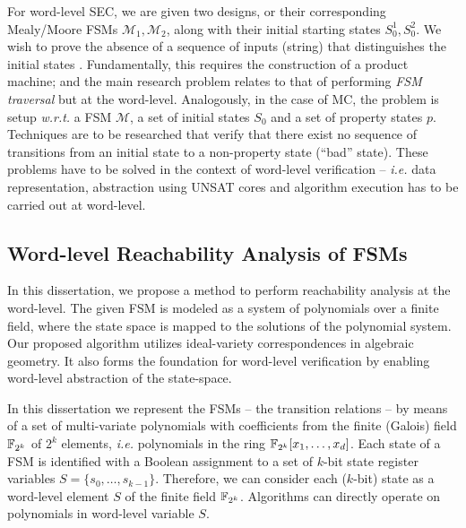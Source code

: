 For word-level SEC, we are given two designs, or their corresponding
Mealy/Moore FSMs ${\mathcal{M}}_1,{\mathcal{M}}_2$, along with their
initial starting states $S_0^1,S_0^2$. We wish to prove the absence of
a sequence of inputs (string) that distinguishes the initial
states \cite{coudert:iccad90,coudert1990verification}. Fundamentally, this requires 
the construction of a product machine; and the main research problem
relates to that of performing {\it FSM traversal} \cite{touati1990implicit}
but  at the word-level. Analogously, in the case of MC, the problem
is setup {\it w.r.t.} a FSM $\mathcal{M}$, a set of initial states $S_0$ and
a set of property states $p$. Techniques are to be researched that
verify that there exist no sequence of transitions from an initial
state to a non-property state (``bad'' state). These problems have to
be solved in the context of word-level verification -- {\it i.e.} data
representation, abstraction using UNSAT cores and
algorithm execution has to be carried out at word-level.


\subsection{Word-level Reachability Analysis of FSMs}
In this dissertation, we propose a method to perform reachability analysis at the word-level. 
	The given FSM is modeled as a system of polynomials over a finite field,
	where the state space is mapped to the solutions of the polynomial system.
	Our proposed algorithm utilizes ideal-variety correspondences in algebraic geometry.
	It also forms the foundation for word-level verification by enabling word-level abstraction of the
  state-space.

In this dissertation we represent
the FSMs -- the transition relations -- by means of a set of
multi-variate polynomials with coefficients from the finite (Galois)
field ${\mathbb{F}}_{2^k}$ of $2^k$ elements, {\it i.e.} polynomials in the ring
${\mathbb{F}}_{2^k}[x_1,\dots,x_d]$. Each state of a FSM is identified with a
Boolean assignment to a set of $k$-bit state register variables
$S=\{s_0,\dots,s_{k-1}\}$. Therefore, we can consider each ($k$-bit)
state as a word-level element $S$ of the finite field
${\mathbb{F}}_{2^k}$. Algorithms can directly operate on polynomials in word-level
variable $S$. 

